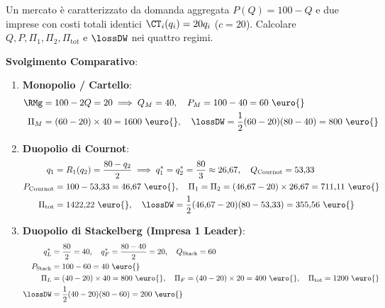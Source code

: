 \begin{esercizio}
Un mercato è caratterizzato da domanda aggregata $P(Q) = 100 - Q$ e due imprese con costi totali identici $\CT_i(q_i) = 20 q_i$ ($c = 20$). Calcolare $Q, P, \Pi_1, \Pi_2, \Pi_{\text{tot}}$ e $\lossDW$ nei quattro regimi.

\tcbline
\textbf{Svolgimento Comparativo}:
\begin{enumerate}
    \item \textbf{Monopolio / Cartello}:
    \begin{align*}
        \RMg &= 100 - 2Q = 20 \implies Q_M = 40, \quad P_M = 100 - 40 = 60\text{ \euro{}} \\
        \Pi_M &= (60 - 20) \times 40 = 1600\text{ \euro{}}, \quad \lossDW = \frac{1}{2}(60 - 20)(80 - 40) = 800\text{ \euro{}}
    \end{align*}
    
    \item \textbf{Duopolio di Cournot}:
    \begin{align*}
        q_1 &= R_1(q_2) = \frac{80 - q_2}{2} \implies q_1^* = q_2^* = \frac{80}{3} \approx 26{,}67, \quad Q_{\text{Cournot}} = 53{,}33 \\
        P_{\text{Cournot}} &= 100 - 53{,}33 = 46{,}67\text{ \euro{}}, \quad \Pi_1 = \Pi_2 = (46{,}67 - 20) \times 26{,}67 = 711{,}11\text{ \euro{}} \\
        \Pi_{\text{tot}} &= 1422{,}22\text{ \euro{}}, \quad \lossDW = \frac{1}{2}(46{,}67 - 20)(80 - 53{,}33) = 355{,}56\text{ \euro{}}
    \end{align*}
    
    \item \textbf{Duopolio di Stackelberg (Impresa 1 Leader)}:
    \begin{align*}
        q_L^* &= \frac{80}{2} = 40, \quad q_F^* = \frac{80 - 40}{2} = 20, \quad Q_{\text{Stack}} = 60 \\
        P_{\text{Stack}} &= 100 - 60 = 40\text{ \euro{}} \\
        \Pi_L &= (40 - 20) \times 40 = 800\text{ \euro{}}, \quad \Pi_F = (40 - 20) \times 20 = 400\text{ \euro{}}, \quad \Pi_{\text{tot}} = 1200\text{ \euro{}} \\
        \lossDW &= \frac{1}{2}(40 - 20)(80 - 60) = 200\text{ \euro{}}
    \end{align*}
    

\end{enumerate}
\end{esercizio}
